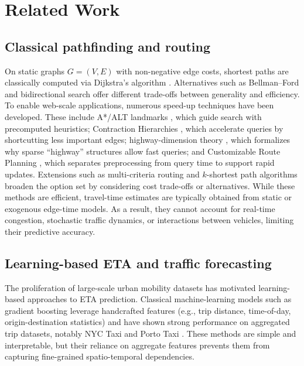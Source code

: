 \section{Related Work}

\subsection{Classical pathfinding and routing}
On static graphs \(G=(V,E)\) with non-negative edge costs, shortest paths are classically computed via Dijkstra's algorithm \cite{dijkstra1959}. Alternatives such as Bellman--Ford \cite{bellman1958routing} and bidirectional search \cite{pohl1971bi} offer different trade-offs between generality and efficiency. To enable web-scale applications, numerous speed-up techniques have been developed. These include A*/ALT landmarks \cite{goldberg2005alt}, which guide search with precomputed heuristics; Contraction Hierarchies \cite{geisberger2008ch}, which accelerate queries by shortcutting less important edges; highway-dimension theory \cite{abraham2010highwaydimension}, which formalizes why sparse “highway” structures allow fast queries; and Customizable Route Planning \cite{delling2011crp}, which separates preprocessing from query time to support rapid updates. Extensions such as multi-criteria routing and $k$-shortest path algorithms \cite{yen1971ksp} broaden the option set by considering cost trade-offs or alternatives. While these methods are efficient, travel-time estimates are typically obtained from static or exogenous edge-time models. As a result, they cannot account for real-time congestion, stochastic traffic dynamics, or interactions between vehicles, limiting their predictive accuracy.

\subsection{Learning-based ETA and traffic forecasting}
The proliferation of large-scale urban mobility datasets has motivated learning-based approaches to ETA prediction. Classical machine-learning models such as gradient boosting \cite{chen2016xgboost} leverage handcrafted features (e.g., trip distance, time-of-day, origin-destination statistics) and have shown strong performance on aggregated trip datasets, notably NYC Taxi and Porto Taxi \cite{nyc_tlc,moreira2013porto}. These methods are simple and interpretable, but their reliance on aggregate features prevents them from capturing fine-grained spatio-temporal dependencies.


